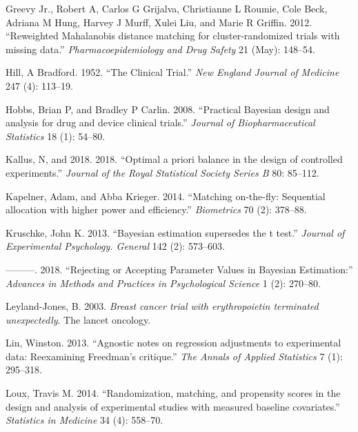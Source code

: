 \documentclass[12pt,oneside]{book}
\newlength{\li}\setlength{\li}{14.48pt}
\newlength{\di}\setlength{\di}{-3.5mm}
\theoremstyle{definition}
\theoremstyle{definition}
\theoremstyle{definition}
\theoremstyle{remark}
\begin{document}
\leavevmode\hypertarget{ref-GreevyJr:2012hp}{}%
Greevy Jr., Robert A, Carlos G Grijalva, Christianne L Roumie, Cole
Beck, Adriana M Hung, Harvey J Murff, Xulei Liu, and Marie R Griffin.
2012. ``Reweighted Mahalanobis distance matching for cluster-randomized
trials with missing data.'' \emph{Pharmacoepidemiology and Drug Safety}
21 (May): 148--54.

\leavevmode\hypertarget{ref-Hill:1952hc}{}%
Hill, A Bradford. 1952. ``The Clinical Trial.'' \emph{New England
Journal of Medicine} 247 (4): 113--19.

\leavevmode\hypertarget{ref-Hobbs:2008ce}{}%
Hobbs, Brian P, and Bradley P Carlin. 2008. ``Practical Bayesian design
and analysis for drug and device clinical trials.'' \emph{Journal of
Biopharmaceutical Statistics} 18 (1): 54--80.

\leavevmode\hypertarget{ref-Kallus:2018um}{}%
Kallus, N, and 2018. 2018. ``Optimal a priori balance in the design of
controlled experiments.'' \emph{Journal of the Royal Statistical Society
Series B} 80: 85--112.

\leavevmode\hypertarget{ref-Kapelner:2014cu}{}%
Kapelner, Adam, and Abba Krieger. 2014. ``Matching on-the-fly:
Sequential allocation with higher power and efficiency.''
\emph{Biometrics} 70 (2): 378--88.

\leavevmode\hypertarget{ref-Kruschke:2013jy}{}%
Kruschke, John K. 2013. ``Bayesian estimation supersedes the t test.''
\emph{Journal of Experimental Psychology. General} 142 (2): 573--603.

\leavevmode\hypertarget{ref-Kruschke:2018bz}{}%
---------. 2018. ``Rejecting or Accepting Parameter Values in Bayesian
Estimation:'' \emph{Advances in Methods and Practices in Psychological
Science} 1 (2): 270--80.

\leavevmode\hypertarget{ref-LeylandJones:2003kt}{}%
Leyland-Jones, B. 2003. \emph{Breast cancer trial with erythropoietin
terminated unexpectedly}. The lancet oncology.

\leavevmode\hypertarget{ref-Lin:2013jh}{}%
Lin, Winston. 2013. ``Agnostic notes on regression adjustments to
experimental data: Reexamining Freedman's critique.'' \emph{The Annals
of Applied Statistics} 7 (1): 295--318.

\leavevmode\hypertarget{ref-Loux:2014bu}{}%
Loux, Travis M. 2014. ``Randomization, matching, and propensity scores
in the design and analysis of experimental studies with measured
baseline covariates.'' \emph{Statistics in Medicine} 34 (4): 558--70.
\end{document}

